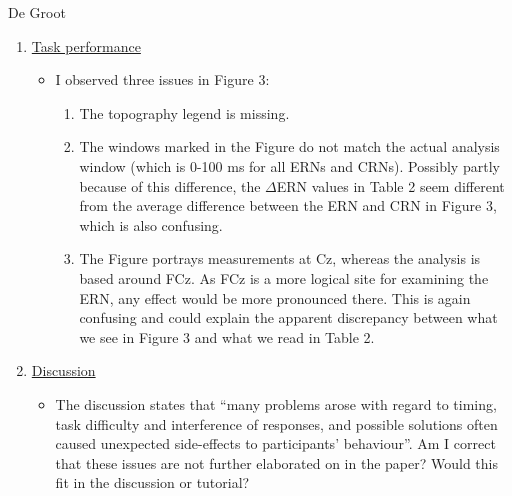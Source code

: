 \documentclass[twocolumn, serif, authordate, review]{jote-article}
\begin{document}
\begin{paracol}{2}
\begin{reviewend}{De Groot}
\begin{enumerate}[label=\textbf{\arabic*}), start=0]
    \item \hyperref[sec:taskperformance]{Task performance}
        \begin{itemize}
            \item I observed three issues in Figure 3:
            \begin{enumerate}
                \item The topography legend is missing.
                \item The windows marked in the Figure do not match the actual analysis window (which is 0-100 ms for all ERNs and CRNs). Possibly partly because of this difference, the ${\Delta}$ERN values in Table 2 seem different from the average difference between the ERN and CRN in Figure 3, which is also confusing.
                \item The Figure portrays measurements at Cz, whereas the analysis is based around FCz. As FCz is a more logical site for examining the ERN, any effect would be more pronounced there. This is again confusing and could explain the apparent discrepancy between what we see in Figure 3 and what we read in Table 2.
            \end{enumerate}
        \end{itemize}

    \item \hyperref[sec:discussion]{Discussion}
        \begin{itemize}
            \item The discussion states that ``many problems arose with regard to timing, task difficulty and interference of responses, and possible solutions often caused unexpected side-effects to participants' behaviour''. Am I correct that these issues are not further elaborated on in the paper? Would this fit in the discussion or tutorial?
        \end{itemize}
        

\end{enumerate}
\end{reviewend}
\end{paracol}
\end{document}
